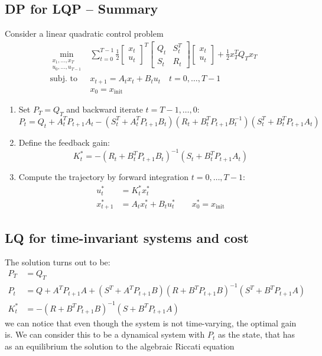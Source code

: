 \documentclass[openany]{book}
\theoremstyle{definition}
\theoremstyle{remark}
\begin{document}
\subsection{DP for LQP – Summary}
Consider a linear quadratic control problem 
\begin{align*}
    \min_{\substack{x_1,\dots,x_T \\ u_0,\dots,u_{T-1}}} & \displaystyle\sum_{t=0}^{T-1}\displaystyle\frac{1}{2}\begin{bmatrix}
        x_t \\ u_t
    \end{bmatrix}^T \begin{bmatrix}
        Q_t & S_t^T \\ S_t & R_t
    \end{bmatrix}  \begin{bmatrix}
        x_t \\ u_t
    \end{bmatrix}+ \displaystyle\frac{1}{2}x_T^TQ_Tx_T\\
    \text{subj. to } & x_{t+1} = A_tx_t + B_tu_t \quad t=0,\dots,T-1\\
    &x_0 = x_{\text{init}}
\end{align*}
\begin{enumerate}
    \item Set $P_T=Q_T$ and backward iterate $t=T-1,\dots,0$:
        \[
            P_t = Q_t +A_t^TP_{t+1}A_t-(S_t^T+A_t^TP_{t+1}B_t)(R_t+B_t^TP_{t+1}B_t^{-1})(S_t^T+B_t^TP_{t+1}A_t)
        \]
    \item Define the feedback gain: 
        \[
            K_t^* = -(R_t+B_t^TP_{t+1}B_t)^{-1}(S_t+B_t^TP_{t+1}A_t)
        \]
    \item Compute the trajectory by forward integration $t=0,\dots,T-1$:
        \begin{align*}
            u_t^* &= K_t^*x_t^*\\
            x_{t+1}^* &= A_tx_t^*+B_tu_t^* \qquad x_0^* = x_{\text{init}}
        \end{align*}
\end{enumerate}


\subsection{LQ for time-invariant systems and cost}
The solution turns out to be: 
\begin{align*}
    P_T &= Q_T \\ 
    P_t &= Q + A^TP_{t+1}A + (S^T+A^TP_{t+1}B)(R+B^TP_{t+1}B)^{-1}(S^T+B^TP_{t+1}A)\\
    K_t^* &= -(R+B^TP_{t+1}B)^{-1}(S+B^TP_{t+1}A)
\end{align*}
we can notice that even though the system is not time-varying, the optimal gain is. We can consider this to be a dynamical system with $P_t$ as the state, that has as an equilibrium the solution to the algebraic Riccati equation
\end{document}
